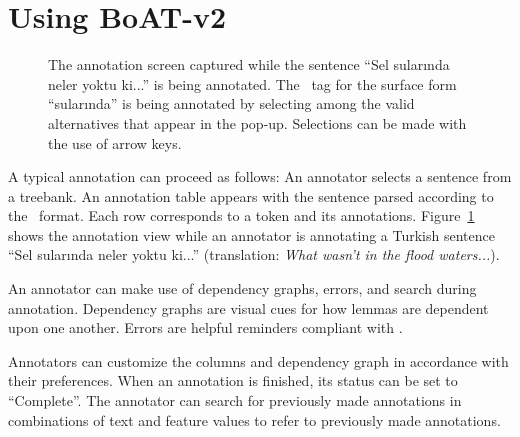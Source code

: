 \section{Using BoAT-v2}
\label{sec:annotation}


\begin{figure}[th!]
    \centering
    \caption{The annotation screen captured while the sentence ``Sel sularında neler yoktu ki...'' is being annotated. The \deprel\ tag for the surface form ``sularında'' is being annotated by selecting among the valid alternatives that appear in the pop-up. Selections can be made with the use of arrow keys.}
    \label{fig:anno-fig}
\end{figure}


A typical annotation can proceed as follows:
An annotator selects a sentence from a treebank.
An annotation table appears with the sentence parsed according to the \ud\ format.
Each row corresponds to a token and its annotations.
Figure~\ref{fig:anno-fig} shows the annotation view while an annotator is annotating a Turkish sentence ``Sel sularında neler yoktu ki...'' (translation: \textit{What wasn't in the flood waters...}).

An annotator can make use of dependency graphs, errors, and search during annotation.
Dependency graphs are visual cues for how lemmas are dependent upon one another.
Errors are helpful reminders compliant with \ud.

Annotators can customize the columns and dependency graph in accordance with their preferences.
When an annotation is finished, its status can be set to ``Complete''.
The annotator can search for previously made annotations in combinations of text and feature values to refer to previously made annotations.
